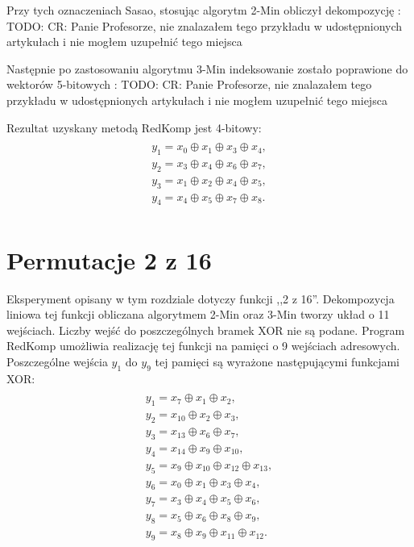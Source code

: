 


Przy tych oznaczeniach Sasao, stosując algorytm 2-Min obliczył dekompozycję \cite{sasao-s-min}:
TODO: CR: Panie Profesorze, nie znalazałem tego przykładu w udostępnionych artykułach i nie mogłem uzupełnić tego miejsca

Następnie po zastosowaniu algorytmu 3-Min indeksowanie zostało poprawione do wektorów 5-bitowych \cite{sasao-s-min}:
TODO: CR: Panie Profesorze, nie znalazałem tego przykładu w udostępnionych artykułach i nie mogłem uzupełnić tego miejsca

Rezultat uzyskany metodą RedKomp jest 4-bitowy:
\begin{multline} \\
y_1 = x_0 \oplus x_1 \oplus x_3 \oplus x_4, \\
y_2 = x_3 \oplus x_4 \oplus x_6 \oplus x_7, \\
y_3 = x_1 \oplus x_2 \oplus x_4 \oplus x_5, \\
y_4 = x_4 \oplus x_5 \oplus x_7 \oplus x_8. \\
\end{multline}

\section{Permutacje 2 z 16}

Eksperyment opisany w tym rozdziale dotyczy funkcji ,,2 z 16''.
Dekompozycja liniowa tej funkcji obliczana algorytmem 2-Min oraz 3-Min \cite{sasao-s-min} tworzy układ o 11 wejściach.
Liczby wejść do poszczególnych bramek XOR nie są podane.
Program RedKomp umożliwia realizację tej funkcji na pamięci o 9 wejściach adresowych.
Poszczególne wejścia $y_1$ do $y_9$ tej pamięci są wyrażone następującymi funkcjami XOR:
\begin{multline} \\
y_1 = x_7 \oplus x_1 \oplus x_2, \\
y_2 = x_{10} \oplus x_2 \oplus x_3, \\
y_3 = x_{13} \oplus x_6 \oplus x_7, \\
y_4 = x_{14} \oplus x_9 \oplus x_{10}, \\
y_5 = x_9 \oplus x_{10} \oplus x_{12} \oplus x_{13}, \\
y_6 = x_0 \oplus x_1 \oplus x_3 \oplus x_4, \\
y_7 = x_3 \oplus x_4 \oplus x_5 \oplus x_6, \\
y_8 = x_5 \oplus x_6 \oplus x_8 \oplus x_9, \\
y_9 = x_8 \oplus x_9 \oplus x_{11} \oplus x_{12}. \\
\end{multline}

